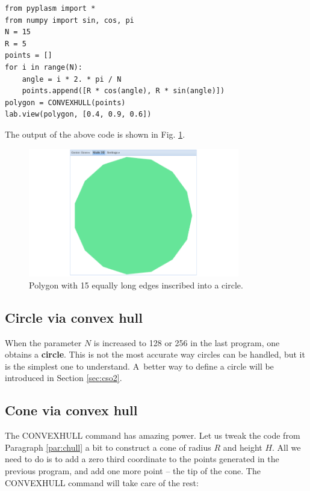 \documentclass{article}
\begin{document}
\begin{verbatim}
from pyplasm import *
from numpy import sin, cos, pi
N = 15
R = 5
points = []
for i in range(N):
    angle = i * 2. * pi / N
    points.append([R * cos(angle), R * sin(angle)])
polygon = CONVEXHULL(points)
lab.view(polygon, [0.4, 0.9, 0.6])
\end{verbatim}
The output of the above code is shown in Fig. \ref{fig:convexhull-1}.

\newpage

\begin{figure}[!ht]
\begin{center}
\includegraphics[width=0.82\textwidth]{img/convexhull-1.png}
\end{center}
\vspace{-2mm}
\caption{Polygon with 15 equally long edges inscribed into a circle.}
\label{fig:convexhull-1}
\end{figure}

\subsection{Circle via convex hull}\label{par:cico}

When the parameter $N$ is increased to 128 or 256 in the last program, 
one obtains a {\bf circle}. This is not the most accurate way circles 
can be handled, but it is the simplest one to understand. A~better way to 
define a circle will be introduced in Section \ref{sec:cso2}. 
 

\subsection{Cone via convex hull}\label{par:coco}

The CONVEXHULL command has amazing power. Let us tweak the code
from Paragraph \ref{par:chull} a bit to construct a cone of radius
$R$ and height $H$. All we need to do is to add a zero third coordinate 
to the points generated in the previous program, and add one more 
point -- the tip of the cone. The CONVEXHULL command will take care 
of the rest:
\end{document}
